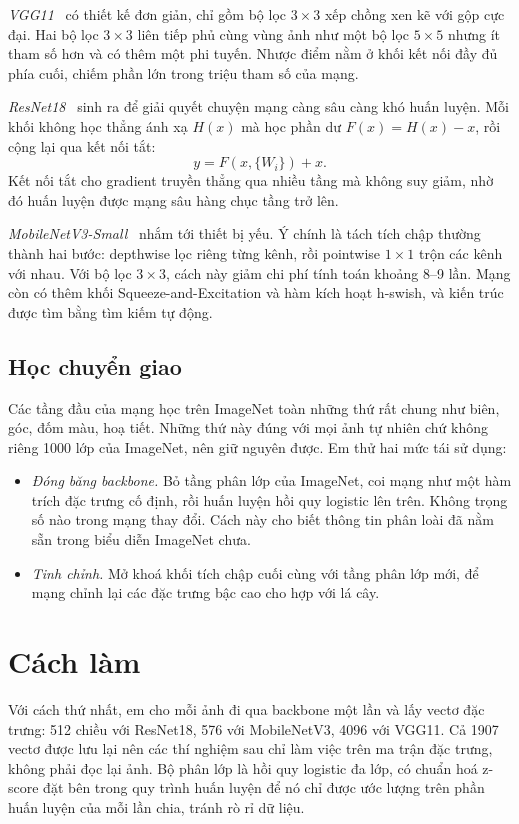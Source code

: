 \documentclass[11pt,a4paper]{article}
\begin{document}
\emph{VGG11}~\cite{simonyan2015} có thiết kế đơn giản, chỉ gồm bộ lọc $3\times3$ xếp chồng xen kẽ
với gộp cực đại. Hai bộ lọc $3\times3$ liên tiếp phủ cùng vùng ảnh như một bộ lọc $5\times5$ nhưng
ít tham số hơn và có thêm một phi tuyến. Nhược điểm nằm ở khối kết nối đầy đủ phía cuối, chiếm phần
lớn trong \heavyparams{} triệu tham số của mạng.

\emph{ResNet18}~\cite{he2016} sinh ra để giải quyết chuyện mạng càng sâu càng khó huấn luyện. Mỗi
khối không học thẳng ánh xạ $H(x)$ mà học phần dư $F(x) = H(x) - x$, rồi cộng lại qua kết nối tắt:
\[
y = F(x, \{W_i\}) + x .
\]
Kết nối tắt cho gradient truyền thẳng qua nhiều tầng mà không suy giảm, nhờ đó huấn luyện được mạng
sâu hàng chục tầng trở lên.

\emph{MobileNetV3-Small}~\cite{howard2019} nhắm tới thiết bị yếu. Ý chính là tách tích chập thường
thành hai bước: depthwise lọc riêng từng kênh, rồi pointwise $1\times1$ trộn các kênh với nhau. Với
bộ lọc $3\times3$, cách này giảm chi phí tính toán khoảng 8--9 lần. Mạng còn có thêm khối
Squeeze-and-Excitation và hàm kích hoạt h-swish, và kiến trúc được tìm bằng tìm kiếm tự động.

\subsection{Học chuyển giao}

Các tầng đầu của mạng học trên ImageNet toàn những thứ rất chung như biên, góc, đốm màu, hoạ tiết.
Những thứ này đúng với mọi ảnh tự nhiên chứ không riêng 1000 lớp của ImageNet, nên giữ nguyên được.
Em thử hai mức tái sử dụng:

\begin{itemize}
  \item \emph{Đóng băng backbone.} Bỏ tầng phân lớp của ImageNet, coi mạng như một hàm trích đặc
        trưng cố định, rồi huấn luyện hồi quy logistic lên trên. Không trọng số nào trong mạng thay
        đổi. Cách này cho biết thông tin phân loài đã nằm sẵn trong biểu diễn ImageNet chưa.
  \item \emph{Tinh chỉnh.} Mở khoá khối tích chập cuối cùng với tầng phân lớp mới, để mạng chỉnh lại
        các đặc trưng bậc cao cho hợp với lá cây.
\end{itemize}

\section{Cách làm}

Với cách thứ nhất, em cho mỗi ảnh đi qua backbone một lần và lấy vectơ đặc trưng: 512 chiều với
ResNet18, 576 với MobileNetV3, 4096 với VGG11. Cả 1907 vectơ được lưu lại nên các thí nghiệm sau chỉ
làm việc trên ma trận đặc trưng, không phải đọc lại ảnh. Bộ phân lớp là hồi quy logistic đa lớp, có
chuẩn hoá z-score đặt bên trong quy trình huấn luyện để nó chỉ được ước lượng trên phần huấn luyện
của mỗi lần chia, tránh rò rỉ dữ liệu.
\end{document}

